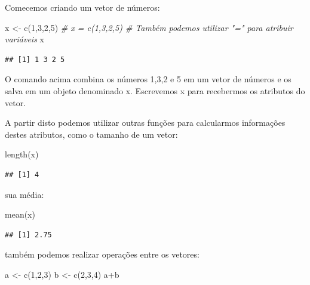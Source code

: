 \documentclass[
]{book}
\newenvironment{Shaded}{\begin{snugshade}}{\end{snugshade}}
\newcommand{\CommentTok}[1]{\textcolor[rgb]{0.56,0.35,0.01}{\textit{#1}}}
\newcommand{\DecValTok}[1]{\textcolor[rgb]{0.00,0.00,0.81}{#1}}
\newcommand{\FunctionTok}[1]{\textcolor[rgb]{0.00,0.00,0.00}{#1}}
\newcommand{\NormalTok}[1]{#1}
\newcommand{\OtherTok}[1]{\textcolor[rgb]{0.56,0.35,0.01}{#1}}
\newcommand{\SpecialCharTok}[1]{\textcolor[rgb]{0.00,0.00,0.00}{#1}}
\begin{document}
Comecemos criando um vetor de números:

\begin{Shaded}
\begin{Highlighting}[]
\NormalTok{x }\OtherTok{\textless{}{-}} \FunctionTok{c}\NormalTok{(}\DecValTok{1}\NormalTok{,}\DecValTok{3}\NormalTok{,}\DecValTok{2}\NormalTok{,}\DecValTok{5}\NormalTok{)}
\CommentTok{\# x = c(1,3,2,5) \# Também podemos utilizar "=" para atribuir variáveis}
\NormalTok{x}
\end{Highlighting}
\end{Shaded}

\begin{verbatim}
## [1] 1 3 2 5
\end{verbatim}

O comando acima combina os números 1,3,2 e 5 em um vetor de números e os salva em um objeto denominado x. Escrevemos x para recebermos os atributos do vetor.

A partir disto podemos utilizar outras funções para calcularmos informações destes atributos, como o tamanho de um vetor:

\begin{Shaded}
\begin{Highlighting}[]
\FunctionTok{length}\NormalTok{(x)}
\end{Highlighting}
\end{Shaded}

\begin{verbatim}
## [1] 4
\end{verbatim}

sua média:

\begin{Shaded}
\begin{Highlighting}[]
\FunctionTok{mean}\NormalTok{(x)}
\end{Highlighting}
\end{Shaded}

\begin{verbatim}
## [1] 2.75
\end{verbatim}

também podemos realizar operações entre os vetores:

\begin{Shaded}
\begin{Highlighting}[]
\NormalTok{a }\OtherTok{\textless{}{-}} \FunctionTok{c}\NormalTok{(}\DecValTok{1}\NormalTok{,}\DecValTok{2}\NormalTok{,}\DecValTok{3}\NormalTok{)}
\NormalTok{b }\OtherTok{\textless{}{-}} \FunctionTok{c}\NormalTok{(}\DecValTok{2}\NormalTok{,}\DecValTok{3}\NormalTok{,}\DecValTok{4}\NormalTok{)}
\NormalTok{a}\SpecialCharTok{+}\NormalTok{b}
\end{Highlighting}
\end{Shaded}
\end{document}
